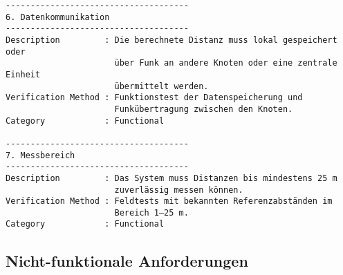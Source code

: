 \begin{verbatim}
-------------------------------------
6. Datenkommunikation
-------------------------------------
Description         : Die berechnete Distanz muss lokal gespeichert oder 
                      über Funk an andere Knoten oder eine zentrale Einheit 
                      übermittelt werden.
Verification Method : Funktionstest der Datenspeicherung und 
                      Funkübertragung zwischen den Knoten.
Category            : Functional

-------------------------------------
7. Messbereich
-------------------------------------
Description         : Das System muss Distanzen bis mindestens 25 m 
                      zuverlässig messen können.
Verification Method : Feldtests mit bekannten Referenzabständen im 
                      Bereich 1–25 m.
Category            : Functional
\end{verbatim}


\subsection{Nicht-funktionale Anforderungen}

